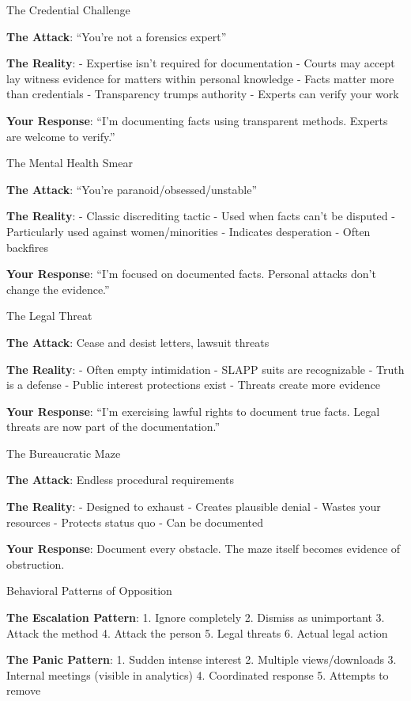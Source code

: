 The Credential Challenge

\textbf{The Attack}: ``You're not a forensics expert''

\textbf{The Reality}: - Expertise isn't required for documentation -
Courts may accept lay witness evidence for matters within personal
knowledge - Facts matter more than credentials - Transparency trumps
authority - Experts can verify your work

\textbf{Your Response}: ``I'm documenting facts using transparent
methods. Experts are welcome to verify.''

The Mental Health Smear

\textbf{The Attack}: ``You're paranoid/obsessed/unstable''

\textbf{The Reality}: - Classic discrediting tactic - Used when facts
can't be disputed - Particularly used against women/minorities -
Indicates desperation - Often backfires

\textbf{Your Response}: ``I'm focused on documented facts. Personal
attacks don't change the evidence.''

The Legal Threat

\textbf{The Attack}: Cease and desist letters, lawsuit threats

\textbf{The Reality}: - Often empty intimidation - SLAPP suits are
recognizable - Truth is a defense - Public interest protections exist -
Threats create more evidence

\textbf{Your Response}: ``I'm exercising lawful rights to document true
facts. Legal threats are now part of the documentation.''

The Bureaucratic Maze

\textbf{The Attack}: Endless procedural requirements

\textbf{The Reality}: - Designed to exhaust - Creates plausible denial -
Wastes your resources - Protects status quo - Can be documented

\textbf{Your Response}: Document every obstacle. The maze itself becomes
evidence of obstruction.

Behavioral Patterns of Opposition

\textbf{The Escalation Pattern}: 1. Ignore completely 2. Dismiss as
unimportant 3. Attack the method 4. Attack the person 5. Legal threats
6. Actual legal action

\textbf{The Panic Pattern}: 1. Sudden intense interest 2. Multiple
views/downloads 3. Internal meetings (visible in analytics) 4.
Coordinated response 5. Attempts to remove

